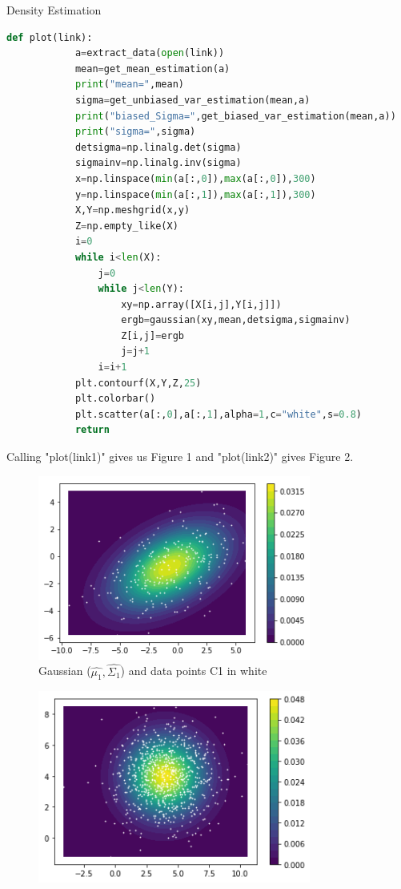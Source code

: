\documentclass[
ngerman,
]{tudaexercise}
\begin{document}
\begin{task}{Density Estimation}
\begin{subtask}
\begin{lstlisting}[language=Python]
		def plot(link):
			a=extract_data(open(link))
			mean=get_mean_estimation(a)
			print("mean=",mean)
			sigma=get_unbiased_var_estimation(mean,a)
			print("biased_Sigma=",get_biased_var_estimation(mean,a))
			print("sigma=",sigma)
			detsigma=np.linalg.det(sigma)
			sigmainv=np.linalg.inv(sigma)
			x=np.linspace(min(a[:,0]),max(a[:,0]),300)
			y=np.linspace(min(a[:,1]),max(a[:,1]),300)
			X,Y=np.meshgrid(x,y)
			Z=np.empty_like(X)
			i=0
			while i<len(X):
				j=0
				while j<len(Y):
					xy=np.array([X[i,j],Y[i,j]])
					ergb=gaussian(xy,mean,detsigma,sigmainv)
					Z[i,j]=ergb
					j=j+1
				i=i+1
			plt.contourf(X,Y,Z,25)
			plt.colorbar()
			plt.scatter(a[:,0],a[:,1],alpha=1,c="white",s=0.8)
			return
	\end{lstlisting}
	Calling "plot(link1)" gives us Figure 1 and "plot(link2)" gives Figure 2.
	\begin{figure}[H]
	\includegraphics[width=0.8\textwidth]{d1plot.png}
	\caption{Gaussian ($\hat{\mu_1},\hat{\Sigma_1}$) and data points C1 in white}
	\end{figure}
	\begin{figure}[H]
	\includegraphics[width=0.8\textwidth]{d2plot.png}

\end{figure}
\end{subtask}
\end{task}
\end{document}
